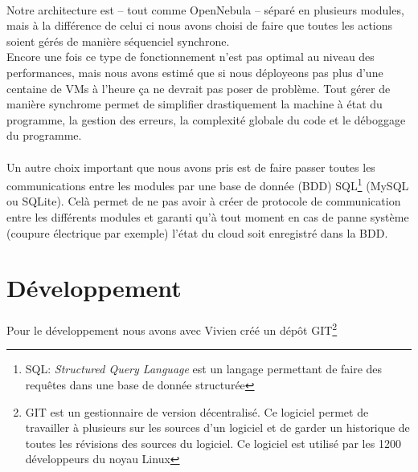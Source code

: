 \paragraph*{}
Notre architecture est -- tout comme OpenNebula -- séparé en plusieurs modules, mais à la différence de celui ci nous avons choisi de faire que toutes les actions soient gérés
de manière séquenciel synchrone.\\ %
Encore une fois ce type de fonctionnement n'est pas optimal au niveau des performances, mais nous avons estimé que si nous déployeons pas plus d'une centaine de VMs à
l'heure ça ne devrait pas poser de problème.
Tout gérer de manière synchrome permet de simplifier drastiquement la machine à état du programme, la gestion des erreurs, la complexité globale du code et le déboggage
du programme.

\paragraph*{}
Un autre choix important que nous avons pris est de faire passer toutes les communications entre les modules par une base de donnée (BDD)
SQL\footnote{SQL: \emph{Structured Query Language} est un langage permettant de faire des requêtes dans une base de donnée structurée} (MySQL ou SQLite).
Celà permet de ne pas avoir à créer de protocole de communication entre les différents modules et garanti qu'à tout moment en cas de panne système (coupure électrique
par exemple) l'état du cloud soit enregistré dans la BDD.

\section{Développement}

\paragraph*{}
Pour le développement nous avons avec Vivien créé un dépôt GIT\footnote{GIT est un gestionnaire de version décentralisé. Ce logiciel permet de travailler à plusieurs
sur les sources d'un logiciel et de garder un historique de toutes les révisions des sources du logiciel. Ce logiciel est utilisé par les 1200 développeurs du noyau Linux}

